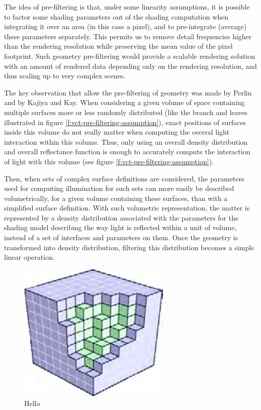 The idea of pre-filtering is that, under some linearity assumptions, it is possible to factor some shading parameters out of the shading computation when integrating it over an area (in this case a pixel), and to pre-integrate (average) these parameters separately. This permits us to remove detail frequencies higher than the rendering resolution while preserving the mean value of the pixel footprint. Such geometry pre-filtering would provide a scalable rendering solution with an amount of rendered data depending only on the rendering resolution, and thus scaling up to very complex scenes.

The key observation that allow the pre-filtering of geometry was made by Perlin\cite{a:hypetrtexture} and by Kajiya and Kay\cite{a:Renderingfurwiththreedimensionaltextures}. When considering a given volume of space containing multiple surfaces more or less randomly distributed (like the branch and leaves illustrated in figure \ref{f:vct-pre-filtering-assumption}), exact positions of surfaces inside this volume do not really matter when computing the overral light interaction within this volume. Thus, only using an overall density distribution and overall reflectance function is enough to accurately compute the interaction of light with this volume (see figure \ref{f:vct-pre-filtering-assumption}).

Then, when sets of complex surface definitions are considered, the parameters used for computing illumination for such sets can more easily be described volumetrically, for a given volume containing these surfaces, than with a simplified surface definition. With such volumetric representation, the matter is represented by a density distribution associated with the parameters for the shading model describing the way light is reflected within a unit of volume, instead of a set of interfaces and parameters on them. Once the geometry is transformed into density distribution, filtering this distribution becomes a simple linear operation. 

\begin{figure}
	\sidecaption
	\includegraphics[width=0.65\textwidth]{graphics/vct/vct-4-2}
	\caption{Hello}
\end{figure}



